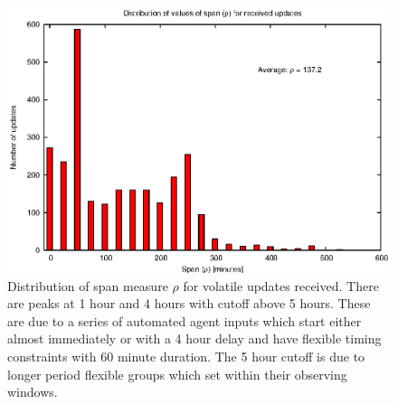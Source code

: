 \begin{figure}[htbp]
\begin{center}
    \includegraphics[scale=1.0, angle=0]{figures/vol_span.eps}
\end{center}
\caption[Distribution of span measure $\rho$ for volatile updates received.]
{Distribution of span measure $\rho$ for volatile updates received. There are peaks at 1 hour and 4 hours with cutoff above 5 hours. These are due to a series of automated agent inputs which start either almost immediately or with a 4 hour delay and have flexible timing constraints with 60 minute duration. The 5 hour cutoff is due to longer period flexible groups which set within their observing windows.}
\label{fig:vol_spandist}
\end{figure}


